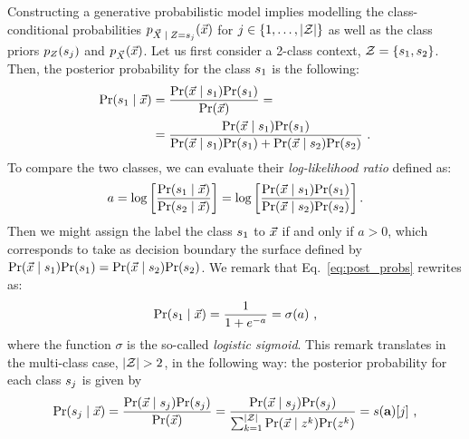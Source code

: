 Constructing a generative probabilistic model implies modelling the class-conditional probabilities $\pdf_{\given{\vaLeakVec}{\sensRandVar = \sensVarValue{j}}}(\vLeakVec)$ for $j\in \{1,\dots,\lvert\mathcal{Z}\rvert\}$ as well as the class priors $p_{Z}(s_{j})$ and $p_{\vec{X}}(\vec{x})$. Let us first consider a 2-class context, \ie $\mathcal{Z} = \{s_{1}, s_{2}\}$. Then, the posterior probability for the class $s_{1}$ is the following:
\begin{align}\label{eq:post_probs}
\prob(\given{\sensVarValue{1}}{\vLeakVec}) &= \frac{\prob(\given{\vLeakVec}{\sensVarValue{1}})\prob(\sensVarValue{1})}{\prob(\vLeakVec)}=\\
&=\frac{\prob(\given{\vLeakVec}{\sensVarValue{1}})\prob(\sensVarValue{1})}{\prob(\given{\vLeakVec}{\sensVarValue{1}})\prob(\sensVarValue{1}) + \prob(\given{\vLeakVec}{\sensVarValue{2}})\prob(\sensVarValue{2})}\mbox{ .}
\end{align}
To compare the two classes, we can evaluate their \emph{log-likelihood ratio} defined as:
\begin{equation}\label{eq:log-ratio}
a = \log\left[\frac{\prob(\given{\sensVarValue{1}}{\vLeakVec})}{\prob(\given{\sensVarValue{2}}{\vLeakVec})}\right] =  \log\left[\frac{\prob(\given{\vLeakVec}{\sensVarValue{1}})\prob(\sensVarValue{1})}{\prob(\given{\vLeakVec}{\sensVarValue{2}})\prob(\sensVarValue{2})}\right].
\end{equation}
Then we might assign the label the class $s_{1}$ to $\vec{x}$  if and only if $a>0$, which corresponds to take as decision boundary the surface defined by $\prob(\given{\vLeakVec}{\sensVarValue{1}})\prob(\sensVarValue{1}) = \prob(\given{\vLeakVec}{\sensVarValue{2}})\prob(\sensVarValue{2})$.
We remark that Eq.~\eqref{eq:post_probs} rewrites as:
\begin{equation}\label{eq:post_probs_sigmoid}
\prob(\given{\sensVarValue{1}}{\vLeakVec}) = \frac{1}{1+e^{-a}} = \sigma(a)\mbox{ ,}
\end{equation}
where the function $\sigma$ is the so-called \emph{logistic sigmoid}. This remark translates in the multi-class case, \ie $\lvert\mathcal{Z}\rvert >2$, in the following way: the posterior probability for each class $s_{j}$ is given by
\begin{equation}\label{eq:post_probs_multi-class}
\prob(\given{\sensVarValue{j}}{\vLeakVec})  = \frac{\prob(\given{\vLeakVec}{\sensVarValue{j}})\prob(\sensVarValue{j})}{\prob(\vLeakVec)} = \frac{\prob(\given{\vLeakVec}{\sensVarValue{j}})\prob(\sensVarValue{j})}{\sum_{k=1}^{\nbClasses}\prob(\given{\vLeakVec}{\sensVar^k})\prob(\sensVar^k )} = \softmax (\aaa)[j]\mbox{ ,}
\end{equation}
